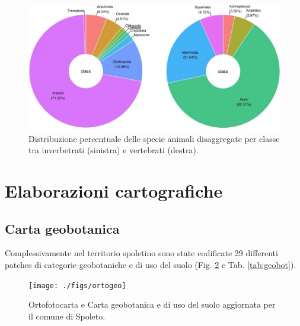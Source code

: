 \documentclass[
]{book}
\begin{document}
\begin{figure}

{\centering \includegraphics[width=\linewidth]{./figs/faunaSpoletoInv} 

}

\caption{Distribuzione percentuale delle specie animali disaggregate per classe tra inverbetrati (sinistra) e vertebrati (destra).}\label{fig:faunaperc}
\end{figure}

\section{Elaborazioni cartografiche}\label{elaborazioni-cartografiche}

\subsection{Carta geobotanica}\label{carta-geobotanica-1}

Complessivamente nel territorio spoletino sono state codificate 29 differenti patches di categorie geobotaniche e di uso del suolo (Fig. \ref{fig:ortogeo} e Tab.
\ref{tab:geobot}).

\begin{figure}

{\centering \texttt{[image: ./figs/ortogeo]} 

}

\caption{Ortofotocarta e Carta geobotanica e di uso del suolo aggiornata per il comune di Spoleto.}\label{fig:ortogeo}
\end{figure}
\end{document}
